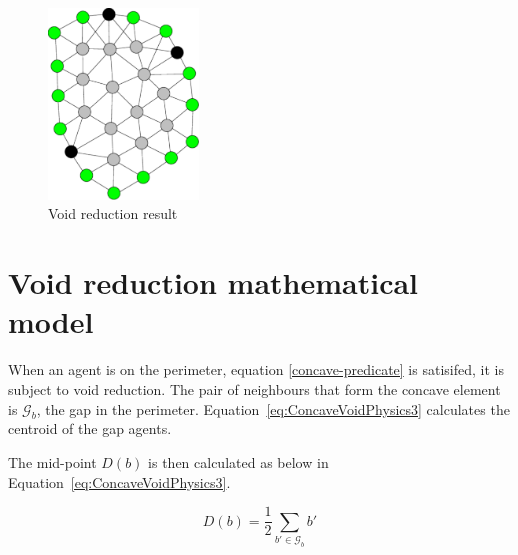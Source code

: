 \documentclass[preprint,12pt]{elsarticle}
\begin{document}
\begin{figure}
\begin{center}
\includegraphics[width=4cm]{figures/PerimeterBotsCircle2}
\end{center}
\caption{Void reduction result\label{fig:OuterPerimeter3}}
\end{figure}

\section{Void reduction mathematical model}\label{concave:ConcaveVoidReduction1}
When an agent is on the perimeter, equation \ref{concave-predicate} is
satisifed, it is subject to void reduction.
The pair of neighbours that form the concave element is $\mathcal G_b$, the
gap in the perimeter.
Equation~\ref{eq:ConcaveVoidPhysics3} calculates the centroid of the gap agents. 



The mid-point $D(b)$ is then calculated as below in Equation~\ref{eq:ConcaveVoidPhysics3}.

\begin{equation}
\label{eq:ConcaveVoidPhysics3}
D(b) = \frac{1}{2}\sum_{b' \in \mathcal G_b}b' 
\end{equation}
\end{document}
